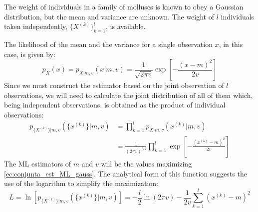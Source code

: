 \begin{example}
\label{ex:gauss_ML}

The weight of individuals in a family of molluscs is known to obey a Gaussian distribution, but the mean and variance are unknown. The weight of $l$ individuals taken independently, $\{X^{(k)}\}_{k=1}^l$, is available.

The likelihood of the mean and the variance for a single observation $x$, in this case, is given by:
\begin{equation}
p_{X}(x) = p_{X|m,v}(x|m,v) = \frac{1}{\sqrt{2\pi v}} \exp\left[-\frac{(x-m)^2}{2 v}\right]
\end{equation}
Since we must construct the estimator based on the joint observation of $l$ observations, we will need to calculate the joint distribution of all of them which, being independent observations, is obtained as the product of individual observations:
\begin{equation}
\label{ec:conjunta_est_ML_gauss}
\begin{split}
p_{\{X^{(k)}\}|m,v}(\{x^{(k)}\}|m,v) 
	& = \prod_{k=1}^l p_{X|m,v}(x^{(k)}|m,v) \\ 
		&= \frac{1}{(2\pi v)^{l/2}} \prod_{k=1}^l \exp\left[-\frac{(x^{(k)}-m)^2}{2 v}\right]
\end{split}
\end{equation}
The ML estimators of $m$ and $v$ will be the values maximizing \eqref{ec:conjunta_est_ML_gauss}. The analytical form of this function suggests the use of the logarithm to simplify the maximization:
\begin{equation}
\label{ec:conjunta_est_ML_gauss_log}
L = \ln \left[ p_{\{X^{(k)}\}|m,v}(\{x^{(k)}\}|m,v) \right] = -\frac{l}{2} \ln(2\pi v) - \frac{1}{2v} \sum_{k=1}^l (x^{(k)}-m)^2
\end{equation}


\end{example}
